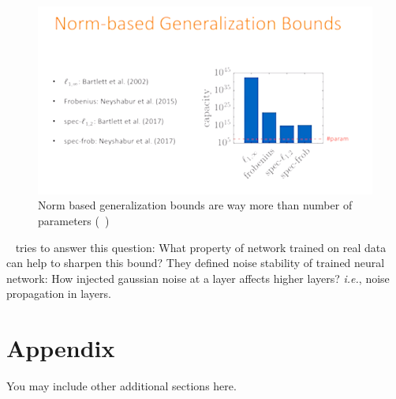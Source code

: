 \documentclass{article} %
\newcommand{\ie}{\emph{i.e.},\xspace}
\begin{document}
\begin{figure}[h]
\begin{center}
\includegraphics[width=0.5\columnwidth]{pix/NormbasedGenBounds.png}
\caption{Norm based generalization bounds are way more than number of parameters (~\cite{arora2018stronger})}
\end{center}
\label{generalization_mystery}
\end{figure}

~\cite{arora2018stronger} tries to answer this question: What property of network trained on real data can help to sharpen this bound? They defined noise stability of trained neural network: How injected gaussian noise at a layer affects higher layers? \ie noise propagation in layers.




















\appendix
\section{Appendix}
You may include other additional sections here. 
\end{document}

